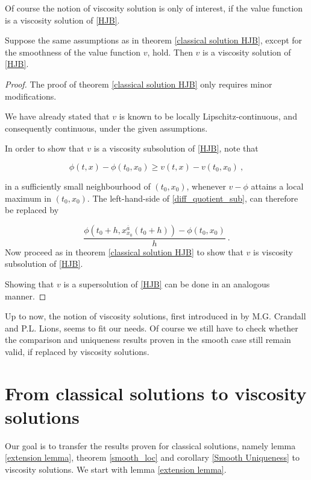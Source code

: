	Of course the notion of viscosity solution is only of interest, if the value function is a viscosity solution of \ref{HJB}.
	
	\begin{theorem}
		\label{viscosity solution HJB}
		Suppose the same assumptions as in theorem \ref{classical solution HJB}, except for the smoothness of the value function $ v $, hold. Then $ v $ is a viscosity solution of \ref{HJB}.
		
		\begin{proof}
			The proof of theorem \ref{classical solution HJB} only requires minor modifications.
			
			We have already stated that $ v $ is known to be locally Lipschitz-continuous, and consequently continuous, under the given assumptions.
			
			In order to show that $ v $ is a viscosity subsolution of \ref{HJB}, note that
			
			\begin{equation*}
				\phi(t, x) - \phi(t_0, x_0) \geq v(t, x) - v(t_0, x_0) \ ,
			\end{equation*}
			
			in a sufficiently small neighbourhood of $ (t_0, x_0) $, whenever $ v - \phi $ attains a local maximum in $ (t_0, x_0) $.
			The left-hand-side of \ref{diff_quotient_sub}, can therefore be replaced by
			
			\begin{equation*}
				\frac{\phi(t_0 + h, x^{\overline{a}}_{x_0}(t_0 + h)) - \phi(t_0, x_0)}{h} \ .
			\end{equation*}
			Now proceed as in theorem \ref{classical solution HJB} to show that $ v $ is viscosity subsolution of \ref{HJB}.
			
			Showing that $ v $ is a supersolution of \ref{HJB} can be done in an analogous manner.
		\end{proof}
	\end{theorem}

	Up to now, the notion of viscosity solutions, first introduced in \cite{viscositydefinition} by M.G. Crandall and P.L. Lions, seems to fit our needs. Of course we still have to check whether the comparison and uniqueness results proven in the smooth case still remain valid, if replaced by viscosity solutions.
	
	\section{From classical solutions to viscosity solutions}
	Our goal is to transfer the results proven for classical solutions, namely lemma \ref{extension lemma}, theorem \ref{smooth_loc} and corollary \ref{Smooth Uniqueness} to viscosity solutions. We start with lemma \ref{extension lemma}.
	
